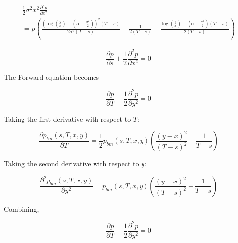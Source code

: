 \documentclass{article}
\theoremstyle{definition}
\begin{document}
\begin{multline*}\frac{1}{2} \sigma^2 x^2 \frac{\partial^2 p}{\partial x^2}\\=p\left( \frac{\left(\log\left(\frac{y}{x}\right)- \left(\alpha-\frac{\sigma^2}{2}\right) \right)^2 (T-s) }{2\sigma^2 (T-s)}- \frac{1}{ 2(T-s)} - \frac{\log\left(\frac{y}{x}\right)- \left(\alpha-\frac{\sigma^2}{2}\right) (T-s) }{ 2(T-s)}      \right)\end{multline*}


\[\frac{\partial p} {\partial s} + \frac{1}{2} \frac{\partial^2 p}{\partial x^2} =0\]

The Forward equation becomes

\[\frac{\partial p} {\partial T} -\frac{1}{2} \frac{\partial^2 p}{\partial y^2} =0\]

Taking the first derivative with respect to \(T\):

\[\frac{\partial p_{bm}(s, T, x, y)}{\partial T}=  \frac{1}{2}p_{bm}(s, T, x, y)\left(\frac{(y-x)^2}{(T-s)^2}-\frac{1}{T-s}\right)  \]

Taking the second derivative with respect to \(y\):

\[\frac{\partial^2 p_{bm}(s, T, x, y)}{\partial y^2}=  p_{bm}(s, T, x, y)\left(\frac{(y-x)^2}{(T-s)^2}-\frac{1}{T-s}\right)  \]

Combining, 

\[\frac{\partial p} {\partial T} -\frac{1}{2} \frac{\partial^2 p}{\partial y^2} =0\]
\end{document}
